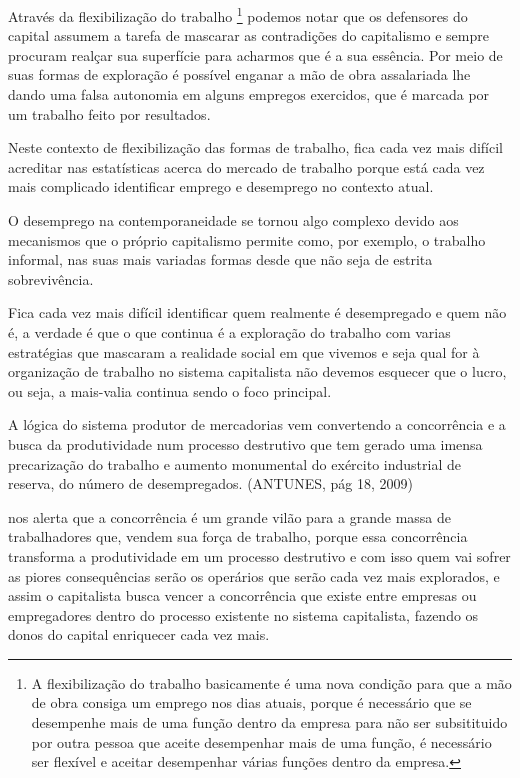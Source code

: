 Através da flexibilização do trabalho \footnote{A flexibilização do trabalho basicamente é uma nova condição para que a mão de obra consiga um emprego nos dias atuais, porque é necessário que se desempenhe mais de uma função dentro da empresa para não ser subsitituido por outra pessoa que aceite desempenhar mais de uma função, é necessário ser flexível e aceitar desempenhar várias
funções dentro da empresa.} podemos notar que os defensores do capital assumem a tarefa de mascarar as contradições do capitalismo e sempre procuram realçar sua superfície para acharmos que é a sua essência. Por meio de suas formas de exploração é possível enganar a mão de obra assalariada lhe dando uma falsa autonomia em alguns empregos exercidos, que é marcada por um trabalho feito
por resultados.

Neste contexto de flexibilização das formas de trabalho, fica cada vez mais difícil acreditar nas estatísticas acerca do mercado de trabalho porque está cada vez mais complicado identificar emprego e desemprego no contexto atual. 

O desemprego na contemporaneidade se tornou algo complexo devido aos mecanismos que o próprio capitalismo permite como, por exemplo, o trabalho informal, nas suas mais variadas formas desde que não seja de estrita sobrevivência. 

Fica cada vez mais difícil identificar quem realmente é desempregado e quem não é, a verdade é que o que continua é a exploração do trabalho com varias estratégias que mascaram a realidade social em que vivemos e seja qual for à organização de trabalho no sistema capitalista não devemos esquecer que o lucro, ou seja, a mais-valia continua sendo o foco principal.

\begin{citacao}
A lógica do sistema produtor de mercadorias vem convertendo a concorrência e a busca da produtividade num processo destrutivo que tem gerado uma imensa precarização do trabalho e aumento monumental do exército industrial de reserva, do número de desempregados. (ANTUNES, pág 18, 2009) 
\end{citacao}

\cite{antunes2009infoproletarios} nos alerta que a concorrência é um grande vilão para a
grande massa de trabalhadores que, vendem sua força de trabalho, porque essa
concorrência transforma a produtividade em um processo destrutivo e com isso
quem vai sofrer as piores consequências serão os operários que serão cada vez
mais explorados, e assim o capitalista busca vencer a concorrência que existe
entre empresas ou empregadores dentro do processo existente no sistema
capitalista, fazendo os donos do capital enriquecer cada vez mais.

